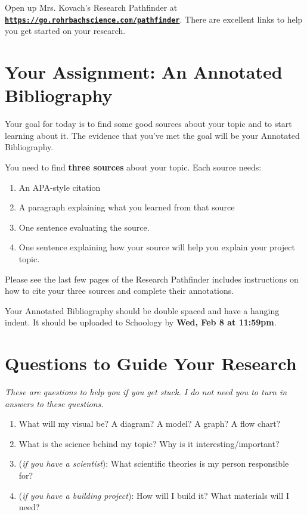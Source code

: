 \documentclass[10pt]{exam}
\begin{document}
Open up Mrs. Kovach's Research Pathfinder at \texttt{\href{https://go.rohrbachscience.com/pathfinder}{\bf https://go.rohrbachscience.com/pathfinder}}.  There are excellent links to help you get started on your research.  

\section*{Your Assignment: An Annotated Bibliography}

Your goal for today is to find some good sources about your topic and to start learning about it.  The evidence that you've met the goal will be your Annotated Bibliography.

\vspace{1em}

\noindent
You need to find {\bf three sources} about your topic. Each source needs:
%
\begin{enumerate}
  \item An APA-style citation
  \item A paragraph explaining what you learned from that source
  \item One sentence evaluating the source.
  \item One sentence explaining how your source will help you explain your project topic.
\end{enumerate}
%
Please see the last few pages of the Research Pathfinder includes instructions on how to cite your three sources and complete their annotations.

\vspace{1em}

\noindent
Your Annotated Bibliography should be double spaced and have a hanging indent. It should be uploaded to Schoology by {\bf Wed, Feb 8 at 11:59pm}. 


\section*{Questions to Guide Your Research}

\emph{These are questions to help you if you get stuck.  I do not need you to turn in answers to these questions.}

\begin{enumerate}
  \item What will my visual be?  A diagram? A model? A graph? A flow chart?
  \item What is the science behind my topic?  Why is it interesting/important?
  \item (\emph{if you have a scientist}): What scientific theories is my person responsible for?
  \item (\emph{if you have a building project}): How will I build it?  What materials will I need?
\end{enumerate}
\end{document}

